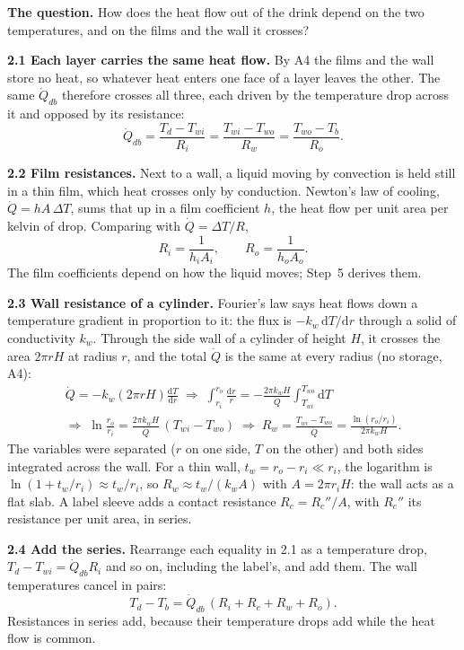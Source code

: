 \documentclass[11pt,a4paper]{article}
\newcommand{\dd}{\mathrm{d}}
\newcommand{\Qdb}{\dot Q_{db}}
\newcommand{\sub}[1]{\par\smallskip\noindent\textbf{#1}\enspace}
\begin{document}
\textbf{The question.} How does the heat flow out of the drink depend on the two temperatures, and on
the films and the wall it crosses?

\sub{2.1 Each layer carries the same heat flow.} By A4 the films and the wall store no heat, so whatever
heat enters one face of a layer leaves the other. The same $\Qdb$ therefore crosses all three, each
driven by the temperature drop across it and opposed by its resistance:
\[ \Qdb = \frac{T_d - T_{wi}}{R_i} = \frac{T_{wi}-T_{wo}}{R_w} = \frac{T_{wo}-T_b}{R_o}. \]

\sub{2.2 Film resistances.} Next to a wall, a liquid moving by convection is held still in a thin film,
which heat crosses only by conduction. Newton's law of cooling, $\dot Q = hA\,\Delta T$, sums that up in
a film coefficient $h$, the heat flow per unit area per kelvin of drop. Comparing with
$\dot Q = \Delta T/R$,
\[ R_i = \frac{1}{h_iA_i}, \qquad R_o = \frac{1}{h_oA_o}. \]
The film coefficients depend on how the liquid moves; Step~5 derives them.

\sub{2.3 Wall resistance of a cylinder.} Fourier's law says heat flows down a temperature gradient in
proportion to it: the flux is $-k_w\,\dd T/\dd r$ through a solid of conductivity $k_w$. Through the side
wall of a cylinder of height $H$, it crosses the area $2\pi rH$ at radius $r$, and the total $\dot Q$ is
the same at every radius (no storage, A4):
\begin{gather*}
\dot Q = -k_w(2\pi rH)\frac{\dd T}{\dd r}
\;\Rightarrow\;
\int_{r_i}^{r_o}\frac{\dd r}{r} = -\frac{2\pi k_wH}{\dot Q}\int_{T_{wi}}^{T_{wo}}\dd T
\\
\Rightarrow\;
\ln\frac{r_o}{r_i} = \frac{2\pi k_wH}{\dot Q}\,(T_{wi}-T_{wo})
\;\Rightarrow\;
R_w = \frac{T_{wi}-T_{wo}}{\dot Q} = \frac{\ln(r_o/r_i)}{2\pi k_w H}.
\end{gather*}
The variables were separated ($r$ on one side, $T$ on the other) and both sides integrated across the
wall. For a thin wall, $t_w = r_o - r_i \ll r_i$, the logarithm is $\ln(1 + t_w/r_i)\approx t_w/r_i$, so
$R_w \approx t_w/(k_wA)$ with $A = 2\pi r_iH$: the wall acts as a flat slab. A label sleeve adds a
contact resistance $R_c = R_c''/A$, with $R_c''$ its resistance per unit area, in series.

\sub{2.4 Add the series.} Rearrange each equality in 2.1 as a temperature drop, $T_d - T_{wi} = \Qdb R_i$
and so on, including the label's, and add them. The wall temperatures cancel in pairs:
\[ T_d - T_b = \Qdb\,(R_i + R_c + R_w + R_o). \]
Resistances in series add, because their temperature drops add while the heat flow is common.
\end{document}
